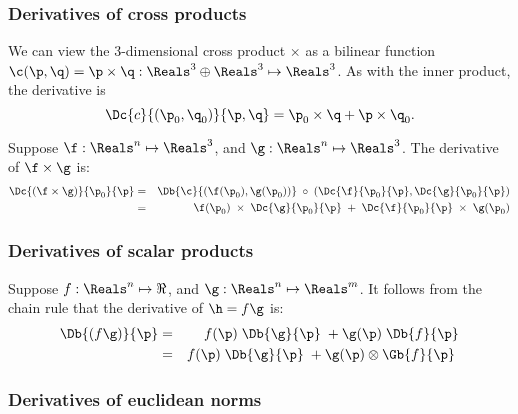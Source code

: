 
\subsubsection{Derivatives of cross products}
\label{sec:cross}

We can view the 3-dimensional cross product
$ \times $
as a bilinear function
$\c(\p,\q) = \p \times \q : \Reals^3 \oplus \Reals^3 \mapsto \Reals^3$.
As with the inner product,
the derivative is
\begin{equation}
\Dc{c}{(\p_0,\q_0)}{\p,\q} = \p_0 \times \q + \p \times \q_0.
\end{equation}

Suppose
$\f:\Reals^{n} \mapsto \Reals^3$, and
$\g:\Reals^{n} \mapsto \Reals^3$.
The derivative of $\f \times \g$ is:
\begin{eqnarray}
\Dc{(\f \times \g)}{\p_0}{\p}
& =
& \Db{\c}{(\f(\p_0),\g(\p_0))} \;\circ \;(\Dc{\f}{\p_0}{\p}, \Dc{\g}{\p_0}{\p})
\\
& =
& \f(\p_0) \;\times \;\Dc{\g}{\p_0}{\p} \;+ \;\Dc{\f}{\p_0}{\p} \;\times \;\g(\p_0) \nonumber
\end{eqnarray}


\subsubsection{Derivatives of scalar products}
\label{sec:scalar}

Suppose
$f:\Reals^{n} \mapsto \Re$, and
$\g:\Reals^{n} \mapsto \Reals^m$.
It follows from the chain rule that the derivative of $\h = f\g$ is:
\begin{eqnarray}
\label{eq:scalar_product_derivative}
\Db{(f\g)}{\p}
& = & f(\p) \;\Db{\g}{\p} \;+ \g(\p) \; \Db{f}{\p}  \\
& = & f(\p) \;\Db{\g}{\p} \;+ \g(\p) \otimes \Gb{f}{\p} \; \nonumber
\end{eqnarray}



\subsubsection{Derivatives of euclidean norms}
\label{sec:norms}

